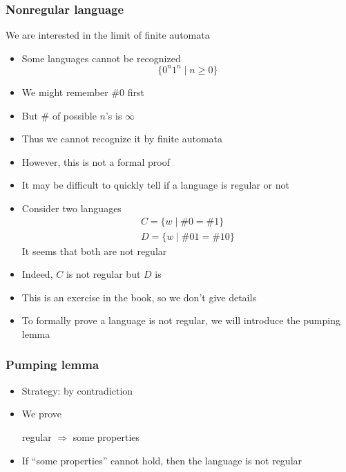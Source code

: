 




\begin{frame}[allowframebreaks] \frametitle{Nonregular language}
We are interested in the limit of finite automata
  \begin{itemize}
\item Some languages cannot be recognized
  \begin{equation*}
    \{0^n 1^n \mid n \geq 0\}
  \end{equation*}
\item We might remember \#0 first

\item [] But \# of possible $n$'s is  $\infty$

\item Thus we cannot recognize it by finite automata

\item However, this is not a formal proof
\item It may be difficult to quickly tell if a language is
  regular or not
\item Consider two languages
  \begin{gather*}
    C=\{w\mid \#0=\#1\}\\
D=\{w \mid \#01=\#10\}
  \end{gather*}
It seems that both are not regular

\item [] Indeed, $C$ is not regular but $D$ is
\item [] This is an exercise in the book, so we don't give details
\item To formally prove a language is not regular, we will
  introduce the pumping lemma
\end{itemize}\end{frame} \begin{frame}[allowframebreaks] \frametitle{Pumping lemma}
  \begin{itemize}
\item Strategy: by contradiction
\item We prove
  \begin{center}
regular $\Rightarrow$ some properties    
  \end{center}
\item If ``some properties'' cannot hold, then the language is not
  regular


\end{itemize}
\end{frame}
